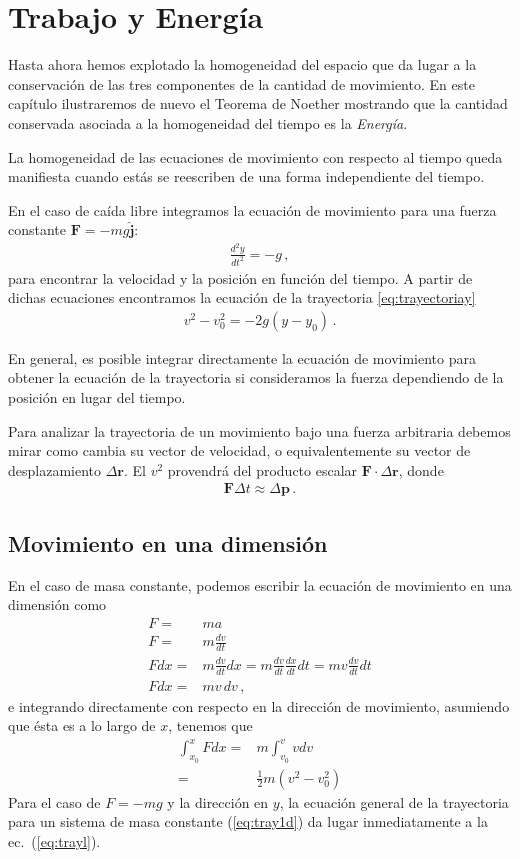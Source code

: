 
\chapter{Trabajo y Energía}
\label{chap:energia}

Hasta ahora hemos explotado la homogeneidad del espacio que da lugar a la conservación de las tres componentes de la cantidad de movimiento. En este capítulo ilustraremos de nuevo el Teorema de Noether mostrando que la cantidad conservada asociada a la homogeneidad del tiempo es la \emph{Energía}. 

La homogeneidad de las ecuaciones de movimiento con respecto al tiempo queda manifiesta cuando estás se reescriben de una forma independiente del tiempo. 
 
En el caso de caída libre integramos la ecuación de movimiento para una fuerza constante $\mathbf{F}=-m g\hat{\mathbf{j}}$:
\begin{align}
  \frac{d^2y}{dt^2}=-g\,,
\end{align}
para encontrar la velocidad y la posición en función del tiempo. A partir de dichas ecuaciones encontramos la ecuación de la trayectoria \eqref{eq:trayectoriay}
\begin{align}
\label{eq:trayl}
  v^2-v_0^2=-2g(y-y_0)\,.
\end{align}

En general, es posible integrar directamente la ecuación de movimiento para obtener la ecuación de la trayectoria si consideramos la fuerza dependiendo de la posición en lugar del tiempo.

Para analizar la trayectoria de un movimiento bajo una fuerza arbitraria debemos mirar como cambia su vector de velocidad, o equivalentemente su vector de desplazamiento $\Delta\mathbf{r}$. El $v^2$ provendrá del producto escalar $\mathbf{F}\cdot \Delta\mathbf{r}$, donde
\begin{align}
  \mathbf{F}\Delta t\approx \Delta\mathbf{p}\,.
\end{align}

\section{Movimiento en una dimensión}
En el caso de masa constante, podemos escribir la ecuación de movimiento en una dimensión como
\begin{align*}
  F=&m a \nonumber\\
  F=& m \frac{dv}{dt} \nonumber\\
  Fdx=& m \frac{dv}{dt} dx = m \frac{dv}{dt}\frac{dx}{dt} dt = m v\frac{dv}{dt} dt \nonumber\\
  Fdx=& m v\, dv\,,
\end{align*}
e integrando directamente con respecto en la dirección de movimiento, asumiendo que ésta es a lo largo de $x$, tenemos que
\begin{align}
\label{eq:tray1d}
\int_{x_0}^x F dx =&m\int_{v_0}^v v dv  \nonumber\\
=&\frac{1}{2}m \left( v^2-v_0^2 \right)
\end{align}
Para el caso de $F=-mg$ y la dirección en $y$, la ecuación general de la trayectoria para un sistema de masa constante (\ref{eq:tray1d}) da lugar inmediatamente a la ec.~(\ref{eq:trayl}).


